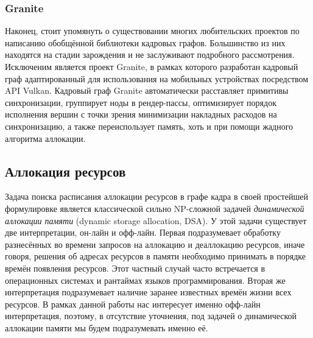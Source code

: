 \subsubsection*{Granite}
Наконец, стоит упомянуть о существовании многих любительских проектов по написанию обобщённой библиотеки кадровых графов. Большинство из них находятся на стадии зарождения и не заслуживают подробного рассмотрения. Исключеним является проект Granite\cite{GraniteBlogPost}, в рамках которого разработан кадровый граф адаптированный для использования на мобильных устройствах посредством API Vulkan. Кадровый граф Granite автоматически расставляет примитивы синхронизации, группирует ноды в рендер-пассы\cite[раздел~8]{VulkanSpec}, оптимизирует порядок исполнения вершин с точки зрения минимизации накладных расходов на синхронизацию, а также переиспользует память, хоть и при помощи жадного алгоритма аллокации.

\subsection{Аллокация ресурсов}
Задача поиска расписания аллокации ресурсов в графе кадра в своей простейшей формулировке является классической сильно NP-сложной\cite{DSAnpcomplete} задачей \textit{динамической аллокации памяти} (dynamic storage allocation, DSA\cite[с. 226]{10.5555/574848}). У этой задачи существует две интерпретации, он-лайн и офф-лайн. Первая подразумевает обработку разнесённых во времени запросов на аллокацию и деаллокацию ресурсов, иначе говоря, решения об адресах ресурсов в памяти необходимо принимать в порядке времён появления ресурсов. Этот частный случай часто встречается в операционных системах и рантаймах языков программирования. Вторая же интерпретация подразумевает наличие заранее известных времён жизни всех ресурсов. В рамках данной работы нас интересует именно офф-лайн интерпретация, поэтому, в отсутствие уточнения, под задачей о динамической аллокации памяти мы будем подразумевать именно её.


